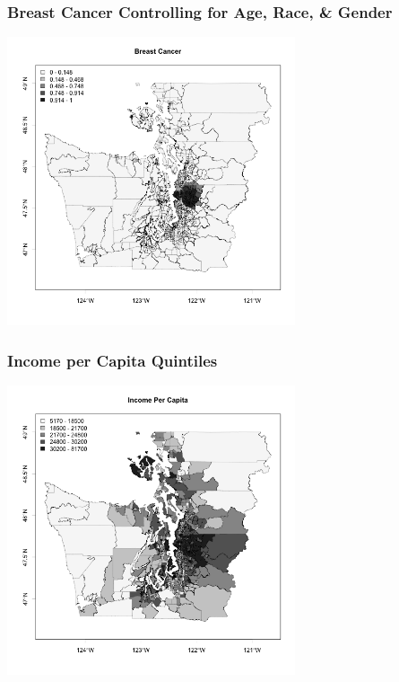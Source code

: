 \documentclass[slides]{beamer}
\begin{document}
\begin{frame}[fragile]
\frametitle{Breast Cancer Controlling for Age, Race, \& Gender}
\begin{center}
\includegraphics[width=8.5cm]{figure/breast.png}
\end{center}
\end{frame}


\begin{frame}[fragile]
\frametitle{Income per Capita Quintiles}
\begin{center}
\includegraphics[width=8.5cm]{figure/income.png}
\end{center}
\end{frame}
\end{document}
